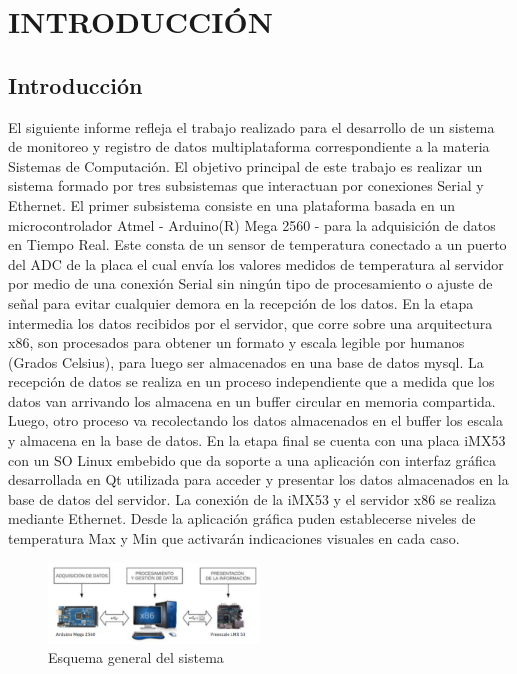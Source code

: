 \documentclass[a4paper,11pt]{book}
\begin{document}


\tableofcontents


\chapter{INTRODUCCIÓN}

\newpage
\section{Introducción}
El siguiente informe refleja el trabajo realizado para el desarrollo de un
sistema de monitoreo y registro de datos multiplataforma correspondiente a la
materia Sistemas de Computación. El objetivo principal de este trabajo es
realizar un sistema formado por tres subsistemas que interactuan por
conexiones Serial y Ethernet. El primer subsistema consiste en una plataforma
basada en un microcontrolador Atmel - Arduino(R) Mega 2560 - para la
adquisición de datos en Tiempo Real. Este consta de un sensor de temperatura
conectado a un puerto del ADC de la placa el cual envía los valores medidos de
temperatura al servidor por medio de una conexión Serial sin ningún tipo de
procesamiento o ajuste de señal para evitar cualquier demora en la recepción de
los datos. 
En la etapa intermedia los datos recibidos por el servidor, que
corre sobre una arquitectura x86, son procesados para obtener un formato y
escala legible por humanos (Grados Celsius), para luego ser almacenados en una
base de datos mysql. La recepción de datos se realiza en un proceso
independiente que a medida que los datos van arrivando los almacena en un buffer
circular en memoria compartida. Luego, otro proceso va recolectando los datos
almacenados en el buffer los escala y almacena en la base de datos.
En la etapa final se cuenta con una placa iMX53 con un SO Linux embebido que da
soporte a una aplicación con interfaz gráfica desarrollada en Qt utilizada para
acceder y presentar los datos almacenados en la base de datos del servidor. La
conexión de la iMX53 y el servidor x86 se realiza mediante Ethernet. Desde la
aplicación gráfica puden establecerse niveles de temperatura Max y Min que
activarán indicaciones visuales en cada caso.   
\begin{figure}[h!]
 \begin{center}
  \includegraphics[width=0.5\textwidth,keepaspectratio=true]{img/fig1.png}
  \caption{Esquema general del sistema}
  \label{fig:esquema}
 \end{center}
\end{figure}
\end{document}
